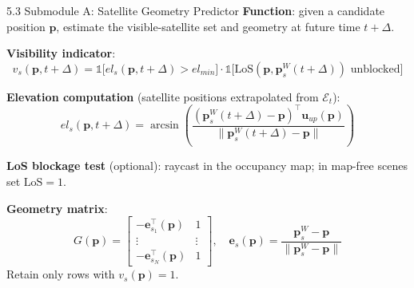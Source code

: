 \documentclass[10pt,aspectratio=169,xcolor=dvipsnames]{beamer}
\newcommand{\1}{\mathbb{1}}
\begin{document}
\begin{frame}{5.3 Submodule A: Satellite Geometry Predictor}
  \small
  \textbf{Function}: given a candidate position $\bm{p}$, estimate the visible-satellite set and geometry at future time $t+\Delta$.

  \medskip
  \textbf{Visibility indicator}:
  \[
    v_s(\bm{p},t+\Delta)=\1\!\bigl[el_s(\bm{p},t+\Delta)>el_{min}\bigr]\cdot\1\!\bigl[\text{LoS}(\bm{p},\bm{p}^W_s(t+\Delta))\text{ unblocked}\bigr]
  \]

  \textbf{Elevation computation} (satellite positions extrapolated from $\mathcal{E}_t$):
  \[
    el_s(\bm{p},t+\Delta)=\arcsin\!\left(\frac{(\bm{p}^W_s(t+\Delta)-\bm{p})^\top\bm{u}_{up}(\bm{p})}{\|\bm{p}^W_s(t+\Delta)-\bm{p}\|}\right)
  \]

  \textbf{LoS blockage test} (optional): raycast in the occupancy map; in map-free scenes set $\text{LoS}=1$.

  \medskip
  \textbf{Geometry matrix}:
  \[
    G(\bm{p})=
    \begin{bmatrix}-\bm{e}_{s_1}^\top(\bm{p}) & 1\\\vdots & \vdots\\-\bm{e}_{s_N}^\top(\bm{p}) & 1
    \end{bmatrix},
    \quad
    \bm{e}_s(\bm{p})=\frac{\bm{p}^W_s-\bm{p}}{\|\bm{p}^W_s-\bm{p}\|}
  \]
  Retain only rows with $v_s(\bm{p})=1$.
\end{frame}
\end{document}
